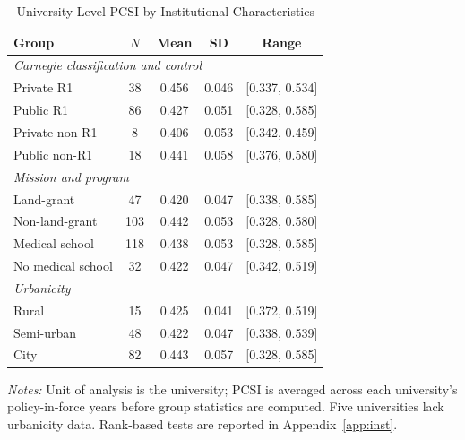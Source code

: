 \begin{table}[htbp]
\centering
\small
\caption{University-Level PCSI by Institutional Characteristics}
\label{tab:inst-means}
\begin{threeparttable}
\begin{tabular}{lcccc}
\toprule
Group & $N$ & Mean & SD & Range \\
\midrule
\multicolumn{5}{l}{\textit{Carnegie classification and control}} \\
\quad Private R1 & 38 & 0.456 & 0.046 & [0.337, 0.534] \\
\quad Public R1 & 86 & 0.427 & 0.051 & [0.328, 0.585] \\
\quad Private non-R1 & 8 & 0.406 & 0.053 & [0.342, 0.459] \\
\quad Public non-R1 & 18 & 0.441 & 0.058 & [0.376, 0.580] \\
\multicolumn{5}{l}{\textit{Mission and program}} \\
\quad Land-grant & 47 & 0.420 & 0.047 & [0.338, 0.585] \\
\quad Non-land-grant & 103 & 0.442 & 0.053 & [0.328, 0.580] \\
\quad Medical school & 118 & 0.438 & 0.053 & [0.328, 0.585] \\
\quad No medical school & 32 & 0.422 & 0.047 & [0.342, 0.519] \\
\multicolumn{5}{l}{\textit{Urbanicity}} \\
\quad Rural & 15 & 0.425 & 0.041 & [0.372, 0.519] \\
\quad Semi-urban & 48 & 0.422 & 0.047 & [0.338, 0.539] \\
\quad City & 82 & 0.443 & 0.057 & [0.328, 0.585] \\
\bottomrule
\end{tabular}
\begin{tablenotes}[flushleft]\footnotesize
\item \textit{Notes:} Unit of analysis is the university; PCSI is averaged across each university's policy-in-force years before group statistics are computed. Five universities lack urbanicity data. Rank-based tests are reported in Appendix~\ref{app:inst}.
\end{tablenotes}
\end{threeparttable}
\end{table}
